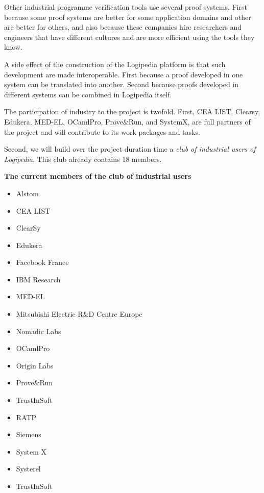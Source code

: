 \begin{enumerate}
  Other industrial programme verification tools use several proof
  systems. First because some proof systems are better for some
  application domains and other are better for others, and also
  because these companies hire researchers and engineers that have
  different cultures and are more efficient using the tools they know.

  A side effect of the construction of the Logipedia platform is that
  such development are made interoperable. First because a proof
  developed in one system can be translated into another. Second
  because proofs developed in different systems can be combined in
  Logipedia itself.
\end{enumerate}

The participation of industry to the project is twofold.  First, CEA
LIST, Clearsy, Edukera, MED-EL, OCamlPro, Prove\&Run, and SystemX, are
full partners of the project and will contribute to its work packages
and tasks.

Second, we will build over the project duration time a {\em club of
  industrial users of Logipedia}. This club already contains
18 members.

\begin{framed}
\begin{center}
  {\bf \Large The current members of the club of industrial users}
\end{center}
\begin{itemize}
\item Alstom
\item CEA LIST
\item ClearSy
\item Edukera
\item Facebook France
\item IBM Research
\item MED-EL
\item Mitsubishi Electric R\&D Centre Europe
\item Nomadic Labs
\item OCamlPro
\item Origin Labs
\item Prove\&Run
\item TrustInSoft
\item RATP
\item Siemens
\item System X
\item Systerel
\item TrustInSoft
\end{itemize}
\end{framed}

